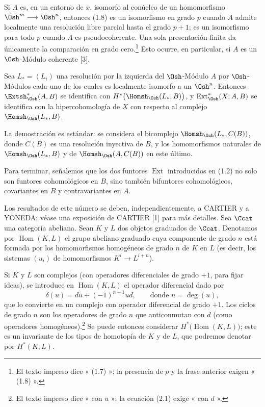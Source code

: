  Si $A$ es, en un entorno de $x$, isomorfo al
conúcleo de un homomorfismo $\Osh^{m}\longrightarrow\Osh^{n}$, entonces (1.8) es un isomorfismo en grado $p$ cuando $A$ admite localmente una resolución libre parcial hasta el grado $p+1$; es un isomorfismo para todo $p$ cuando $A$ es pseudocoherente. Una sola presentación finita da únicamente la comparación en grado cero.\footnote{El texto impreso dice « (1.7) »; la
presencia de $p$ y la frase anterior exigen « (1.8) ».} Esto ocurre, en
particular, si $A$ es un $\Osh$-Módulo coherente [3].

 Sea $L_{*}=(L_i)$ una resolución por la izquierda del
$\Osh$-Módulo $A$ por $\Osh$-Módulos cada uno de los cuales es localmente isomorfo a
un $\Osh^{n}$. Entonces $\Extsh_{\Osh}^{*}(A,B)$ se identifica con
$H^{*}\bigl(\Homsh_{\Osh}(L_{*},B)\bigr)$, y
$\operatorname{Ext}_{\Osh}^{*}(X;A,B)$ se identifica con la hipercohomología de $X$
con respecto al complejo $\Homsh_{\Osh}(L_{*},B)$.

La demostración es estándar: se considera el bicomplejo
$\Homsh_{\Osh}(L_{*},C(B))$, donde $C(B)$ es una resolución inyectiva de $B$, y los
homomorfismos naturales de $\Homsh_{\Osh}(L_{*},B)$ y de
$\Homsh_{\Osh}(A,C(B))$ en este último.

Para terminar, señalemos que los dos funtores $\operatorname{Ext}$ introducidos
en (1.2) no solo son funtores cohomológicos en $B$, sino también
bifuntores cohomológicos, covariantes en $B$ y contravariantes en $A$.


Los resultados de este número se deben, independientemente, a CARTIER y a YONEDA; véase
una exposición de CARTIER [1] para más detalles. Sea $\Ccat$ una categoría abeliana.
Sean $K$ y $L$ dos objetos graduados de $\Ccat$. Denotamos por
$\operatorname{Hom}(K,L)$ el grupo abeliano graduado cuya componente de grado
$n$ está formada por los homomorfismos homogéneos de grado $n$ de $K$ en $L$ (es decir,
los sistemas $(u_i)$ de homomorfismos $K^{i}\longrightarrow L^{i+n}$).

Si $K$ y $L$ son complejos (con operadores diferenciales de grado $+1$, para
fijar ideas), se introduce en $\operatorname{Hom}(K,L)$ el operador
diferencial dado por
\begin{equation}\tag{2.1}
  \delta(u)=du+(-1)^{n+1}ud,\qquad\text{donde }n=\deg(u),
\end{equation}
que lo convierte en un complejo con operador diferencial de grado $+1$. Los ciclos de
grado $n$ son los operadores de grado $n$ que anticonmutan con $d$ (como
operadores homogéneos).\footnote{El texto impreso dice « con $u$ »; la ecuación
(2.1) exige « con $d$ ».} Se puede entonces considerar
$H^{*}\bigl(\operatorname{Hom}(K,L)\bigr)$; este es un invariante de los tipos
de homotopía de $K$ y de $L$, que podremos denotar por $H^{*}(K,L)$.

